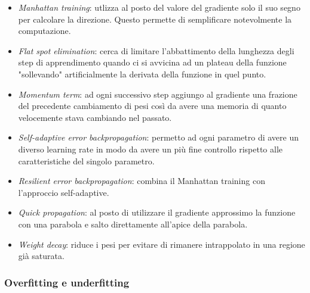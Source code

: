 \documentclass[10pt,a4paper]{article}
\begin{document}
\begin{itemize}
\item{\emph{Manhattan training}: utlizza al posto del valore del gradiente solo il suo segno per calcolare la direzione. Questo permette di semplificare notevolmente la computazione.}
\item{\emph{Flat spot elimination}: cerca di limitare l'abbattimento della lunghezza degli step di apprendimento quando ci si avvicina ad un plateau della funzione "sollevando" artificialmente la derivata della funzione in quel punto.}
\item{\emph{Momentum term}: ad ogni successivo step aggiungo al gradiente una frazione del precedente cambiamento di pesi così da avere una memoria di quanto velocemente stava cambiando nel passato.}
\item{\emph{Self-adaptive error backpropagation}: permetto ad ogni parametro di avere un diverso learning rate in modo da avere un più fine controllo rispetto alle caratteristiche del singolo parametro.}
\item{\emph{Resilient error backpropagation}: combina il Manhattan training con l'approccio self-adaptive.}
\item{\emph{Quick propagation}: al posto di utilizzare il gradiente approssimo la funzione con una parabola e salto direttamente all'apice della parabola.}
\item{\emph{Weight decay}: riduce i pesi per evitare di rimanere intrappolato in una regione già saturata.}
\end{itemize}

\subsubsection{Overfitting e underfitting}
\end{document}
